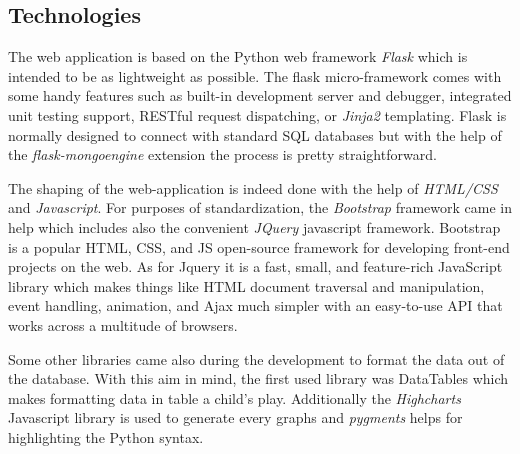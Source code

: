 \subsection{Technologies}
The web application is based on the Python web framework \textit{Flask} which is intended to be as lightweight as possible. The flask micro-framework comes with some handy features such as built-in development server and debugger, integrated unit testing support, RESTful request dispatching, or \textit{Jinja2} templating. Flask is normally designed to connect with standard SQL databases but with the help of the \textit{flask-mongoengine} extension the process is pretty straightforward.

The shaping of the web-application is indeed done with the help of \textit{HTML/CSS} and \textit{Javascript}. For purposes of standardization, the \textit{Bootstrap} framework came in help which includes also the convenient \textit{JQuery} javascript framework. Bootstrap is a popular HTML, CSS, and JS open-source framework for developing front-end projects on the web. As for Jquery it is a fast, small, and feature-rich JavaScript library which makes things like HTML document traversal and manipulation, event handling, animation, and Ajax much simpler with an easy-to-use API that works across a multitude of browsers.

Some other libraries came also during the development to format the data out of the database. With this aim in mind, the first used library was DataTables which makes formatting data in table a child's play. Additionally the \textit{Highcharts} Javascript library is used to generate every graphs and \textit{pygments} helps for highlighting the Python syntax.

